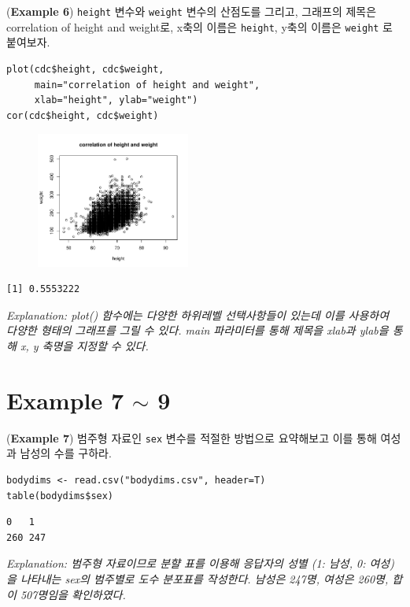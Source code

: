 \documentclass{article}
\begin{document}
(\textbf{Example 6}) \texttt{height} 변수와 \texttt{weight} 변수의 산점도를 그리고, 그래프의 제목은 correlation of height and weight로, x축의 이름은 \texttt{height}, y축의 이름은 \texttt{weight} 로 붙여보자.
\begin{lstlisting}[style={r-style}]
plot(cdc$height, cdc$weight, 
     main="correlation of height and weight",
     xlab="height", ylab="weight")
cor(cdc$height, cdc$weight)
\end{lstlisting}
\begin{figure}[htb!]
    \centering
    \includegraphics[width=0.45\textwidth]{fig/ex6.pdf}
    \label{fig:ex6}
\end{figure}
\begin{lstlisting}[style={out-style}]
[1] 0.5553222
\end{lstlisting}
\emph{Explanation: plot() 함수에는 다양한 하위레벨 선택사항들이 있는데 이를 사용하여 다양한 형태의 그래프를 그릴 수 있다. main 파라미터를 통해 제목을 xlab과 ylab을 통해 x, y 축명을 지정할 수 있다.} \\

\section*{Example 7 $\sim$ 9}

(\textbf{Example 7}) 범주형 자료인 \texttt{sex} 변수를 적절한 방법으로 요약해보고 이를 통해 여성과 남성의 수를 구하라.
\begin{lstlisting}[style={r-style}]
bodydims <- read.csv("bodydims.csv", header=T)
table(bodydims$sex)
\end{lstlisting}
\begin{lstlisting}[style={out-style}]
  0   1 
260 247 
\end{lstlisting}
\emph{Explanation: 범주형 자료이므로 분햘 표를 이용해 응답자의 성별 (1: 남성, 0: 여성)을 나타내는 sex의 범주별로 도수 분포표를 작성한다. 남성은 247명, 여성은 260명, 합이 507명임을 확인하였다.} \\
\end{document}
